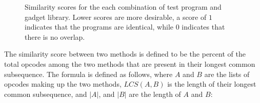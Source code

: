     \begin{figure}[t]
        \vspace{-50pt}
        \caption[Graph of variation between generated programs]
        {Similarity scores for the each combination of test program
        and gadget library. Lower scores are more desirable, a score of $1$
        indicates that the programs are identical, while $0$ indicates that
        there is no overlap.}
        \label{tab:results-different}
    \end{figure}
    The similarity score between two methods is defined to be the percent of
    the total opcodes among the two methods that are present in their longest
    common subsequence. The formula is defined as follows, where
    $A$ and $B$ are the lists of opcodes making up the two methods,
    $LCS(A,B)$ is the length of their longest common subsequence, and $|A|$,
    and $|B|$ are the length of $A$ and $B$:

